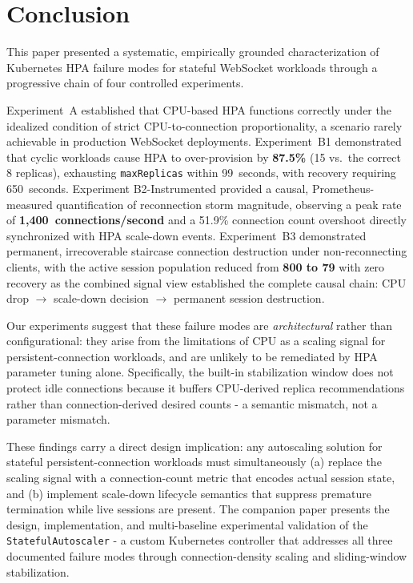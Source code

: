 \documentclass[twocolumn]{svjour3}
\begin{document}
\section{Conclusion}
\label{sec:conclusion}

This paper presented a systematic, empirically grounded characterization of Kubernetes HPA
failure modes for stateful WebSocket workloads through a progressive chain of four controlled
experiments.

Experiment~A established that CPU-based HPA functions correctly under the idealized
condition of strict CPU-to-connection proportionality, a scenario rarely achievable
in production WebSocket deployments. Experiment~B1 demonstrated that cyclic workloads
cause HPA to over-provision by \textbf{87.5\%} (15 vs.\ the correct 8 replicas), exhausting
\texttt{maxReplicas} within 99~seconds, with recovery requiring 650~seconds. Experiment
B2-Instrumented provided a causal, Prometheus-measured quantification of reconnection
storm magnitude, observing a peak rate of \textbf{1,400~connections/second} and a 51.9\%
connection count overshoot directly synchronized with HPA scale-down events. Experiment~B3
demonstrated permanent, irrecoverable staircase connection destruction under non-reconnecting
clients, with the active session population reduced from \textbf{800 to 79} with zero
recovery as the combined signal view established the complete causal chain: CPU drop
$\rightarrow$ scale-down decision $\rightarrow$ permanent session destruction.

Our experiments suggest that these failure modes are \textit{architectural} rather than
configurational: they arise from the limitations of CPU as a scaling signal for
persistent-connection workloads, and are unlikely to be remediated by HPA parameter tuning
alone. Specifically, the built-in stabilization window does not protect idle connections
because it buffers CPU-derived replica recommendations rather than connection-derived
desired counts - a semantic mismatch, not a parameter mismatch.

These findings carry a direct design implication: any autoscaling solution for stateful
persistent-connection workloads must simultaneously (a) replace the scaling signal with a
connection-count metric that encodes actual session state, and (b) implement scale-down
lifecycle semantics that suppress premature termination while live sessions are present. The
companion paper presents the design, implementation, and multi-baseline experimental
validation of the \texttt{StatefulAutoscaler} - a custom Kubernetes controller that
addresses all three documented failure modes through connection-density scaling and
sliding-window stabilization.
\end{document}
